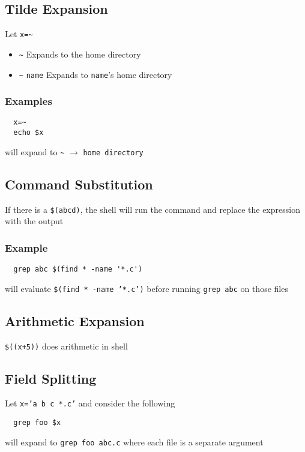 \documentclass[13pt]{article}
\begin{document}
\subsection{Tilde Expansion}
Let \texttt{x=\textasciitilde}
\begin{itemize}[leftmargin = 0pt]
\item [] \texttt{\textasciitilde} Expands to the home directory
\item [] \texttt{\textasciitilde} \texttt{name} Expands to \texttt{name}'s home directory
\end{itemize}

\subsubsection*{Examples}
\begin{verbatim}
  x=~
  echo $x \end{verbatim}
will expand to \texttt{\textasciitilde} $\rightarrow$ \texttt{home directory}

\subsection{Command Substitution}
If there is a \texttt{\$(abcd)}, the shell will run the command and replace the expression with the output
\subsubsection*{Example}
\begin{verbatim}
  grep abc $(find * -name '*.c') \end{verbatim}
will evaluate \texttt{\$(find * -name '*.c')} before running \texttt{grep abc} on those files

\subsection{Arithmetic Expansion}
\texttt{\$((x+5))} does arithmetic in shell

\subsection{Field Splitting}
Let \texttt{x='a b c *.c'} and consider the following
\begin{verbatim}
  grep foo $x
\end{verbatim}
will expand to \texttt{grep foo a\textvisiblespace b\textvisiblespace c\textvisiblespace *.c} where each file is a separate argument
\end{document}

